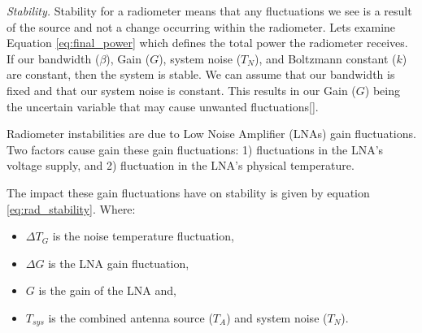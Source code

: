 


\emph{Stability.}  Stability for a radiometer means that any fluctuations we see is a result of the source and not a change occurring within the radiometer.  Lets examine Equation \ref{eq:final_power} which defines the total power the radiometer receives.  If our bandwidth ($\beta$), Gain ($G$), system noise ($T_N$), and Boltzmann constant ($k$) are constant, then the system is stable.  We can assume that our bandwidth is fixed and that our system noise is constant.  This results in our Gain ($G$) being the uncertain variable that may cause unwanted fluctuations[\cite{Evans}]. 

Radiometer instabilities are due to Low Noise Amplifier (LNAs) gain fluctuations.  Two factors cause gain these gain fluctuations: 1) fluctuations in the LNA's voltage supply, and 2) fluctuation in the LNA's physical temperature.  

The impact these gain fluctuations have on stability is given by equation \ref{eq:rad_stability}.  Where:

\begin{itemize}
\item $\Delta T_G$ is the noise temperature fluctuation,
\item $\Delta G$ is the LNA gain fluctuation,
\item $G$ is the gain of the LNA and,
\item $T_{sys}$ is the combined antenna source ($T_A$) and system noise ($T_N$).
\end{itemize}

